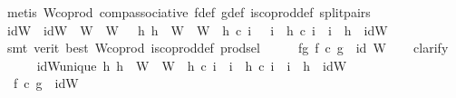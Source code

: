\begin{isabellebody}
\ {\isacharparenleft}{\kern0pt}metis\ W{\isacharunderscore}{\kern0pt}coprod\ comp{\isacharunderscore}{\kern0pt}associative{}\ f{\isacharunderscore}{\kern0pt}def\ g{\isacharunderscore}{\kern0pt}def\ is{\isacharunderscore}{\kern0pt}coprod{\isacharunderscore}{\kern0pt}def\ split{\isacharunderscore}{\kern0pt}pairs{\isacharparenright}{\kern0pt}\isanewline
\ \ \ \ \isanewline
\ \ \isamarkupfalse%
\ idW\ \ {\isachardoublequoteopen}idW\ {\isacharcolon}{\kern0pt}\ W\ {\isasymrightarrow}\ W\ {\isasymand}\ {\isacharparenleft}{\kern0pt}{\isasymforall}\ h{}{\isachardot}{\kern0pt}\ {\isacharparenleft}{\kern0pt}h{}\ {\isacharcolon}{\kern0pt}\ W\ {\isasymrightarrow}\ W\ {\isasymand}\ h{}\ {\isasymcirc}\isactrlsub c\ i\ \ {\isacharequal}{\kern0pt}\ i\ {\isasymand}\ h{}\ {\isasymcirc}\isactrlsub c\ i\ {\isacharequal}{\kern0pt}\ i\ {\isasymlongrightarrow}\ h{}\ {\isacharequal}{\kern0pt}\ idW{\isacharparenright}{\kern0pt}{\isachardoublequoteclose}\isanewline
\ \ \ \ \isamarkupfalse%
\ {\isacharparenleft}{\kern0pt}smt\ {\isacharparenleft}{\kern0pt}verit{\isacharcomma}{\kern0pt}\ best{\isacharparenright}{\kern0pt}\ W{\isacharunderscore}{\kern0pt}coprod\ is{\isacharunderscore}{\kern0pt}coprod{\isacharunderscore}{\kern0pt}def\ prod{\isachardot}{\kern0pt}sel{\isacharparenright}{\kern0pt}\isanewline
\ \ \isamarkupfalse%
\ \isamarkupfalse%
\ fg{\isacharcolon}{\kern0pt}\ {\isachardoublequoteopen}f\ {\isasymcirc}\isactrlsub c\ g\ {\isacharequal}{\kern0pt}\ id\ W{\isachardoublequoteclose}\isanewline
\ \ \isamarkupfalse%
\ clarify\isanewline
\ \ \ \ \isamarkupfalse%
\ idW{\isacharunderscore}{\kern0pt}unique{\isacharcolon}{\kern0pt}\ {\isachardoublequoteopen}{\isasymforall}h{}{\isachardot}{\kern0pt}\ h{}\ {\isacharcolon}{\kern0pt}\ W\ {\isasymrightarrow}\ W\ {\isasymand}\ h{}\ {\isasymcirc}\isactrlsub c\ i\ {\isacharequal}{\kern0pt}\ i\ {\isasymand}\ h{}\ {\isasymcirc}\isactrlsub c\ i\ {\isacharequal}{\kern0pt}\ i\ {\isasymlongrightarrow}\ h{}\ {\isacharequal}{\kern0pt}\ idW{\isachardoublequoteclose}\isanewline
\ \ \ \ \isamarkupfalse%
\ {}{\isacharcolon}{\kern0pt}\ {\isachardoublequoteopen}f\ {\isasymcirc}\isactrlsub c\ g\ {\isacharequal}{\kern0pt}\ idW{\isachardoublequoteclose}\isanewline

\end{isabellebody}
